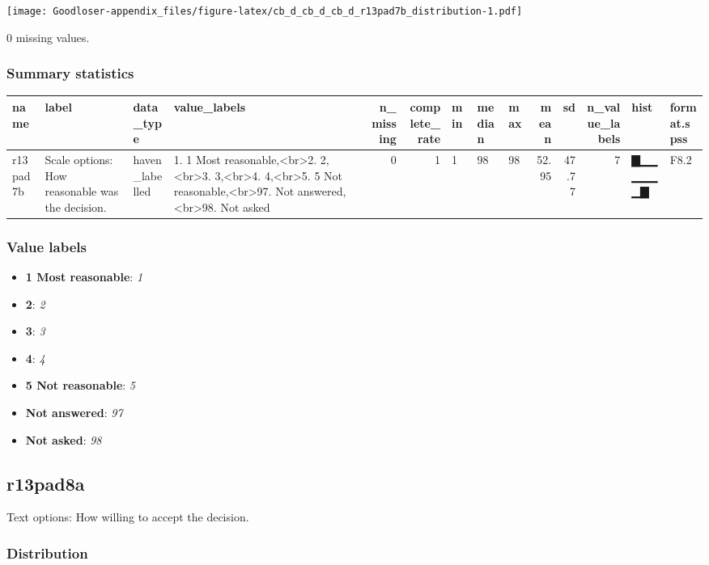\documentclass[
]{book}
\providecommand{\tightlist}{%
  \setlength{\itemsep}{0pt}\setlength{\parskip}{0pt}}
\begin{document}
\texttt{[image: Goodloser-appendix\_files/figure-latex/cb\_d\_cb\_d\_cb\_d\_r13pad7b\_distribution-1.pdf]}

0 missing values.

\hypertarget{r13pad7b_summary}{%
\subsubsection{Summary statistics}\label{r13pad7b_summary}}

\begin{tabular}{l|l|l|l|r|r|l|l|l|r|r|r|l|l}
\hline
name & label & data_type & value_labels & n_missing & complete_rate & min & median & max & mean & sd & n_value_labels & hist & format.spss\\
\hline
r13pad7b & Scale options: How reasonable was the decision. & haven_labelled & 1. 1 Most reasonable,<br>2. 2,<br>3. 3,<br>4. 4,<br>5. 5 Not reasonable,<br>97. Not answered,<br>98. Not asked & 0 & 1 & 1 & 98 & 98 & 52.95 & 47.77 & 7 & ▇▁▁▁▁▁▁▇ & F8.2\\
\hline
\end{tabular}

\hypertarget{r13pad7b_labels}{%
\subsubsection{Value labels}\label{r13pad7b_labels}}

\begin{itemize}
\tightlist
\item
  \textbf{1 Most reasonable}: \emph{1}
\item
  \textbf{2}: \emph{2}
\item
  \textbf{3}: \emph{3}
\item
  \textbf{4}: \emph{4}
\item
  \textbf{5 Not reasonable}: \emph{5}
\item
  \textbf{Not answered}: \emph{97}
\item
  \textbf{Not asked}: \emph{98}
\end{itemize}

\hypertarget{r13pad8a}{%
\subsection{r13pad8a}\label{r13pad8a}}

Text options: How willing to accept the decision.

\hypertarget{r13pad8a_distribution}{%
\subsubsection{Distribution}\label{r13pad8a_distribution}}
\end{document}
